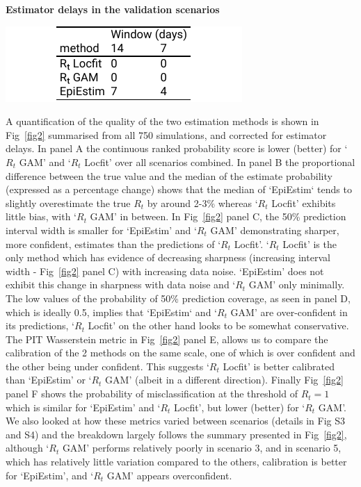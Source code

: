 \documentclass[10pt,letterpaper]{article}
\begin{document}
\begin{table}[!ht]
\caption{{\bf Estimator delays in the validation scenarios}}
\centerline{\includegraphics{fig/tab1-lags}}
\label{tab1}
\end{table}

A quantification of the quality of the two estimation methods is shown in Fig~\ref{fig2} summarised from all 750 simulations, and corrected for estimator delays. In panel A the continuous ranked probability score is lower (better) for `$R_t$ GAM' and `$R_t$ Locfit' over all scenarios combined. In panel B the proportional difference between the true value and the median of the estimate probability (expressed as a percentage change) shows that the median of `EpiEstim` tends to slightly overestimate the true $R_t$ by around 2-3\% whereas `$R_t$ Locfit' exhibits little bias, with `$R_t$ GAM' in between. In Fig~\ref{fig2} panel C, the 50\% prediction interval width is smaller for `EpiEstim' and `$R_t$ GAM' demonstrating sharper, more confident, estimates than the predictions of `$R_t$ Locfit'. `$R_t$ Locfit' is the only method which has evidence of decreasing sharpness (increasing interval width - Fig~\ref{fig2} panel C) with increasing data noise. `EpiEstim' does not exhibit this change in sharpness with data noise and `$R_t$ GAM' only minimally. The low values of the probability of 50\% prediction coverage, as seen in panel D, which is ideally 0.5, implies that `EpiEstim` and `$R_t$ GAM' are over-confident in its predictions, `$R_t$ Locfit' on the other hand looks to be somewhat conservative. The PIT Wasserstein metric in Fig~\ref{fig2} panel E, allows us to compare the calibration of the 2 methods on the same scale, one of which is over confident and the other being under confident. This suggests `$R_t$ Locfit' is better calibrated than `EpiEstim' or `$R_t$ GAM' (albeit in a different direction). Finally Fig~\ref{fig2} panel F shows the probability of misclassification at the threshold of $R_t=1$ which is similar for `EpiEstim' and `$R_t$ Locfit', but lower (better) for `$R_t$ GAM'. We also looked at how these metrics varied between scenarios (details in  Fig S3 and S4) and the breakdown largely follows the summary presented in Fig~\ref{fig2}, although `$R_t$ GAM' performs relatively poorly in scenario 3, and in scenario 5, which has relatively little variation compared to the others, calibration is better for `EpiEstim', and `$R_t$ GAM' appears overconfident.
\end{document}
